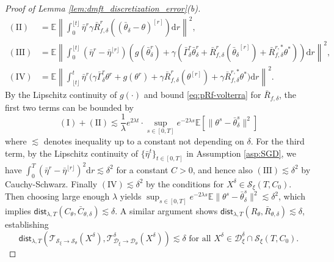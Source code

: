 \documentclass[11pt,letterpaper,reqno]{amsart}
\theoremstyle{definition}
\def\d{\mathrm{d}}
\def\E{\mathbb{E}}
\def\cS{\mathcal{S}}
\def\cD{\mathcal{D}}
\def\trsfrmA{\mathcal{T}_{\mathcal{S}_\xi \to {\mathcal{S}}_\theta}}
\def\trsfrmDA{\mathcal{T}^\delta_{\mathcal{D}_\xi \to {\mathcal{D}}_\theta}}
\def\nI{(\mathrm{I})}
\def\nII{(\mathrm{II})}
\def\nIII{(\mathrm{III})}
\def\nIV{(\mathrm{IV})}
\newcommand{\lbddst}[2]{\mathsf{dist}_{\lambda,T}(#1,#2)}
\newcommand{\flr}[1]{{\lfloor {#1} \rfloor}}
\newcommand{\norm}[1]{\|#1\|}
\newcommand{\prn}[1]{\left({#1}\right)} %
\newcommand{\brk}[1]{\left[{#1}\right]} %
\begin{document}
\begin{proof}[Proof of Lemma \ref{lem:dmft_discretization_error}(b)]
\begin{align*}
(\mathrm{II})&=\E\left\|\int_0^{\flr{t}}
\bar\eta^r {{\gamma} \bar R_{f,\delta}^{r}\prn{\prn{\bar\theta_\delta -
\theta}^{[r]}} } \d r\right\|^2,\\
(\mathrm{III})&=\E\left\|\int_0^{\flr{t}}
\prn{\bar\eta^r - \bar\eta^{\flr{r}}}\prn{g(\bar \theta^{r}_\delta) +
{\gamma}\prn{\bar\Gamma_\delta^{r}\bar \theta^{r}_\delta+ \bar
R_{f,\delta}^{r}\prn{{\bar\theta_\delta}^{[r]}} + \bar
R_{f,\delta}^{r,*}\theta^* }} \d r \right\|^2,\\
(\mathrm{IV})&= \E\left\|\int_{\flr{t}}^t \bar\eta^r \Big({\gamma}\bar\Gamma^r_\delta
\theta^r+g(\theta^r)+{\gamma}\bar R_{f,\delta}^r(\theta^{[r]})+
{\gamma}\bar R_{f,\delta}^{r,*}\theta^*\Big)\d r\right\|^2.
\end{align*}
By the Lipschitz continuity of $g(\cdot)$ and bound \eqref{eq:pRf-volterra}
for $\bar R_{f,\delta}$, the first two terms can be bounded by
\[\nI+\nII \lesssim
\frac{1}{\lambda}e^{2\lambda t}\cdot\sup_{s\in[0,T]} e^{-2\lambda s}
\E\brk{\norm{\theta^s-\bar \theta^s_\delta}^2}\]
where $\lesssim$ denotes inequality up to a constant not depending on $\delta$.
For the third term, by the Lipschitz continuity of
$\{\bar \eta^t\}_{t \in [0,T]}$
in Assumption \ref{asp:SGD}, we have $\int_0^T (\bar \eta^r-\bar
\eta^{\flr{r}})^2 \d r \lesssim \delta^2$ for a constant $C>0$, and hence also
$\nIII \lesssim \delta^2$ by Cauchy-Schwarz. Finally $\nIV \lesssim \delta^2$
by the conditions for $X^\delta \in \cS_\xi(T,C_0)$. Then
choosing large enough $\lambda$ yields $\sup_{s\in[0,T]} e^{-2\lambda s}
\E\norm{\theta^s-\bar \theta^s_\delta}^2 \lesssim \delta^2$, which implies
$\lbddst{C_\theta}{\bar C_{\theta,\delta}} \lesssim \delta$.
A similar argument shows $\lbddst{R_\theta}{\bar R_{\theta,\delta}} \lesssim
\delta$, establishing
\begin{equation}\label{eq:trsfrmAclose}
\lbddst{\trsfrmA(X^\delta)}{\trsfrmDA(X^\delta)} \lesssim \delta
\text{ for all } X^\delta \in \cD_\xi^\delta \cap \cS_\xi(T,C_0).
\end{equation}


\end{proof}
\end{document}
